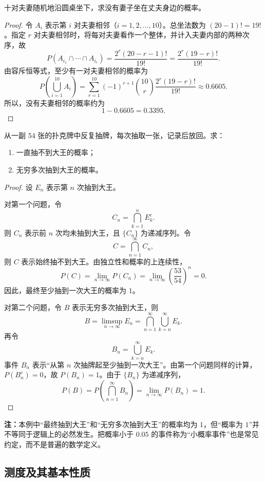 \begin{example}[圆桌夫妻问题]
十对夫妻随机地沿圆桌坐下，求没有妻子坐在丈夫身边的概率。
\end{example}

\begin{proof}
令 $A_i$ 表示第 $i$ 对夫妻相邻（$i=1,2,\ldots,10$）。总坐法数为
$(20-1)!=19!$。指定 $r$ 对夫妻相邻时，将每对夫妻看作一个整体，并计入夫妻内部的两种次序，故
\[
P(A_{i_1}\cap\cdots\cap A_{i_r})
=\frac{2^r(20-r-1)!}{19!}
=\frac{2^r(19-r)!}{19!}.
\]
由容斥恒等式，至少有一对夫妻相邻的概率为
\[
P\left(\bigcup_{i=1}^{10}A_i\right)
=\sum_{r=1}^{10}(-1)^{r+1}\binom{10}{r}
\frac{2^r(19-r)!}{19!}
\approx0.6605.
\]
所以，没有夫妻相邻的概率约为
\[
1-0.6605=0.3395.
\]
\end{proof}

\begin{example}[反复抽取扑克牌中的大王]
从一副 $54$ 张的扑克牌中反复抽牌，每次抽取一张，记录后放回。求：
\begin{enumerate}
\item 一直抽不到大王的概率；
\item 无穷多次抽到大王的概率。
\end{enumerate}
\end{example}

\begin{proof}
设 $E_n$ 表示第 $n$ 次抽到大王。

对第一个问题，令
\[
C_n=\bigcap_{k=1}^{n}E_k^c.
\]
则 $C_n$ 表示前 $n$ 次均未抽到大王，且 $\{C_n\}$ 为递减序列。令
\[
C=\bigcap_{n=1}^{\infty}C_n,
\]
则 $C$ 表示始终抽不到大王。由独立性和概率的上连续性，
\[
P(C)=\lim_{n\to\infty}P(C_n)
=\lim_{n\to\infty}\left(\frac{53}{54}\right)^n=0.
\]
因此，最终至少抽到一次大王的概率为 $1$。

对第二个问题，令 $B$ 表示无穷多次抽到大王，则
\[
B=\limsup_{n\to\infty}E_n
=\bigcap_{n=1}^{\infty}\bigcup_{k=n}^{\infty}E_k.
\]
再令
\[
B_n=\bigcup_{k=n}^{\infty}E_k.
\]
事件 $B_n$ 表示“从第 $n$ 次抽牌起至少抽到一次大王”。由第一个问题同样的计算，
$P(B_n^c)=0$，故 $P(B_n)=1$。由于 $\{B_n\}$ 为递减序列，
\[
P(B)=P\left(\bigcap_{n=1}^{\infty}B_n\right)
=\lim_{n\to\infty}P(B_n)=1.
\]
\end{proof}

\textbf{注：}本例中“最终抽到大王”和“无穷多次抽到大王”的概率均为 $1$，但“概率为 $1$”并不等同于逻辑上的必然发生。把概率小于 $0.05$ 的事件称为“小概率事件”也是常见约定，而不是普遍的数学定义。

\subsection*{测度及其基本性质}

